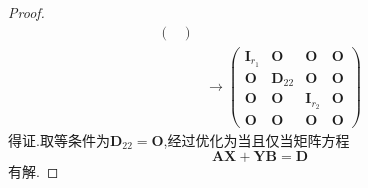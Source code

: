 {\begin{enumerate}[label=\arabic*)]
\begin{proof}
\begin{align*}
\begin{pmatrix}
                      \end{pmatrix}     \\
                       & \longrightarrow
                      \begin{pmatrix}
                          \bm{I}_{r_1} & \bm{O}      & \bm{O}       & \bm{O} \\
                          \bm{O}       & \bm{D}_{22} & \bm{O}       & \bm{O} \\
                          \bm{O}       & \bm{O}      & \bm{I}_{r_2} & \bm{O} \\
                          \bm{O}       & \bm{O}      & \bm{O}       & \bm{O}
                      \end{pmatrix}
                  \end{align*}
                  得证.取等条件为$\bm{D}_{22}=\bm{O}$,经过优化为当且仅当矩阵方程
                  \[
                      \bm{AX}+\bm{YB}=\bm{D}\]
                  有解.
              \end{proof}
    \end{enumerate}
}
